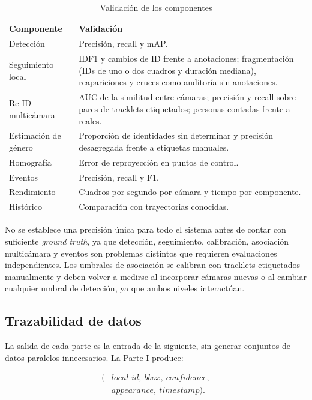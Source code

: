 \documentclass[12pt,letterpaper]{article}
\begin{document}
\begin{table}[H]
\caption{Validación de los componentes}
\label{tab:validation_methodology}
\centering
\footnotesize
\begin{tabular}{p{}p{}}
\hline
\textbf{Componente} & \textbf{Validación} \\
\hline
Detección & Precisión, recall y mAP. \\
Seguimiento local & IDF1 y cambios de ID frente a anotaciones; fragmentación (IDs de uno o dos cuadros y duración mediana), reapariciones y cruces como auditoría sin anotaciones. \\
Re-ID multicámara & AUC de la similitud entre cámaras; precisión y recall sobre pares de tracklets etiquetados; personas contadas frente a reales. \\
Estimación de género & Proporción de identidades sin determinar y precisión desagregada frente a etiquetas manuales. \\
Homografía & Error de reproyección en puntos de control. \\
Eventos & Precisión, recall y F1. \\
Rendimiento & Cuadros por segundo por cámara y tiempo por componente. \\
Histórico & Comparación con trayectorias conocidas. \\
\hline
\end{tabular}
\end{table}

No se establece una precisión única para todo el sistema antes de contar
con suficiente \textit{ground truth}, ya que detección, seguimiento,
calibración, asociación multicámara y eventos son problemas distintos que
requieren evaluaciones independientes. Los umbrales de asociación se
calibran con tracklets etiquetados manualmente y deben volver a medirse
al incorporar cámaras nuevas o al cambiar cualquier umbral de detección,
ya que ambos niveles interactúan.

\subsection{Trazabilidad de datos}

La salida de cada parte es la entrada de la siguiente, sin generar
conjuntos de datos paralelos innecesarios. La Parte I produce:

\begin{equation}
\begin{aligned}
(&local\_id,\ bbox,\ confidence,\\
&appearance,\ timestamp).
\end{aligned}
\end{equation}
\end{document}
